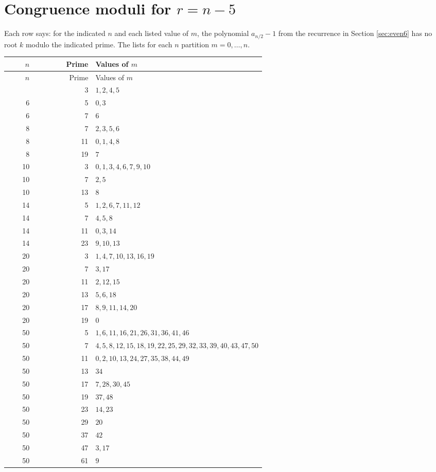 \documentclass[11pt,reqno,letterpaper]{amsart}
\theoremstyle{definition}
\numberwithin{equation}{section}
\begin{document}
\section{Congruence moduli for \texorpdfstring{$r=n-5$}{r=n-5}}
\label{app:evenprimes}
Each row says: for the indicated $n$ and each listed value of $m$, the
polynomial $a_{n/2}-1$ from the recurrence in Section \ref{sec:even6}
has no root $k$ modulo the indicated prime.
The lists for each $n$ partition $m=0,\ldots,n$.
\begin{longtable}{rrp{0.66\linewidth}}
\toprule
$n$&Prime&Values of $m$\\ \midrule
\endfirsthead
\toprule $n$&Prime&Values of $m$\\ \midrule\endhead
\bottomrule\endfoot
6&3&$1,2,4,5$\\
6&5&$0,3$\\
6&7&$6$\\
8&7&$2,3,5,6$\\
8&11&$0,1,4,8$\\
8&19&$7$\\
10&3&$0,1,3,4,6,7,9,10$\\
10&7&$2,5$\\
10&13&$8$\\
14&5&$1,2,6,7,11,12$\\
14&7&$4,5,8$\\
14&11&$0,3,14$\\
14&23&$9,10,13$\\
20&3&$1,4,7,10,13,16,19$\\
20&7&$3,17$\\
20&11&$2,12,15$\\
20&13&$5,6,18$\\
20&17&$8,9,11,14,20$\\
20&19&$0$\\
50&5&$1,6,11,16,21,26,31,36,41,46$\\
50&7&$4,5,8,12,15,18,19,22,25,29,32,33,39,40,43,47,50$\\
50&11&$0,2,10,13,24,27,35,38,44,49$\\
50&13&$34$\\
50&17&$7,28,30,45$\\
50&19&$37,48$\\
50&23&$14,23$\\
50&29&$20$\\
50&37&$42$\\
50&47&$3,17$\\
50&61&$9$\\
\end{longtable}
\end{document}
